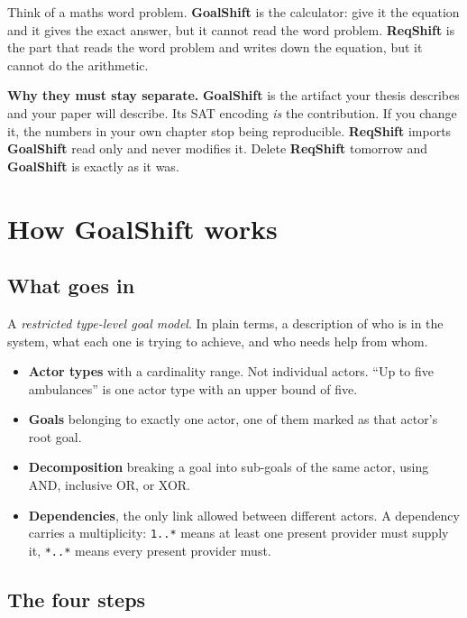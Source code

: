\documentclass[11pt,a4paper]{article}
\newcommand{\gs}{\textbf{GoalShift}}
\newcommand{\rs}{\textbf{ReqShift}}
\begin{document}
\vspace{6pt}

Think of a maths word problem. \gs{} is the calculator: give it the equation and it gives
the exact answer, but it cannot read the word problem. \rs{} is the part that reads the
word problem and writes down the equation, but it cannot do the arithmetic.

\begin{warnbox}
\textbf{Why they must stay separate.} \gs{} is the artifact your thesis describes and
your paper will describe. Its SAT encoding \emph{is} the contribution. If you change it,
the numbers in your own chapter stop being reproducible. \rs{} imports \gs{} read only
and never modifies it. Delete \rs{} tomorrow and \gs{} is exactly as it was.
\end{warnbox}

\section{How GoalShift works}

\subsection{What goes in}

A \emph{restricted type-level goal model}. In plain terms, a description of who is in the
system, what each one is trying to achieve, and who needs help from whom.

\begin{itemize}
\item \textbf{Actor types} with a cardinality range. Not individual actors. ``Up to five
      ambulances'' is one actor type with an upper bound of five.
\item \textbf{Goals} belonging to exactly one actor, one of them marked as that actor's
      root goal.
\item \textbf{Decomposition} breaking a goal into sub-goals of the same actor, using
      AND, inclusive OR, or XOR.
\item \textbf{Dependencies}, the only link allowed between different actors. A
      dependency carries a multiplicity: \texttt{1..*} means at least one present
      provider must supply it, \texttt{*..*} means every present provider must.
\end{itemize}

\subsection{The four steps}
\end{document}
